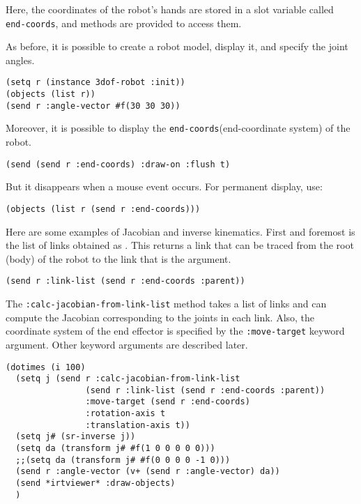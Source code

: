 Here, the coordinates of the robot's hands are stored in a slot variable called \verb|end-coords|, and methods are provided to access them.

As before, it is possible to create a robot model, display it, and specify the joint angles.
{\baselineskip=10pt
\begin{verbatim}
(setq r (instance 3dof-robot :init))
(objects (list r))
(send r :angle-vector #f(30 30 30))
\end{verbatim}
}
Moreover, it is possible to display the \verb|end-coords|(end-coordinate system) of the robot.

{\baselineskip=10pt
\begin{verbatim}
(send (send r :end-coords) :draw-on :flush t)
\end{verbatim}
}

But it disappears when a mouse event occurs. For permanent display, use:

{\baselineskip=10pt
\begin{verbatim}
(objects (list r (send r :end-coords)))
\end{verbatim}
}

Here are some examples of Jacobian and inverse kinematics. First and foremost is the list of links obtained as . This returns a link that can be traced from the root (body) of the robot to the link that is the argument.
{\baselineskip=10pt
\begin{verbatim}
(send r :link-list (send r :end-coords :parent))
\end{verbatim}
}

The \verb|:calc-jacobian-from-link-list| method takes a list of links and can compute the Jacobian corresponding to the joints in each link.
Also, the coordinate system of the end effector is specified by the \verb|:move-target| keyword argument. Other keyword arguments are described later.

{\baselineskip=10pt
\begin{verbatim}
(dotimes (i 100)
  (setq j (send r :calc-jacobian-from-link-list
                (send r :link-list (send r :end-coords :parent))
                :move-target (send r :end-coords)
                :rotation-axis t
                :translation-axis t))
  (setq j# (sr-inverse j))
  (setq da (transform j# #f(1 0 0 0 0 0)))
  ;;(setq da (transform j# #f(0 0 0 0 -1 0)))
  (send r :angle-vector (v+ (send r :angle-vector) da))
  (send *irtviewer* :draw-objects)
  )
\end{verbatim}
}

